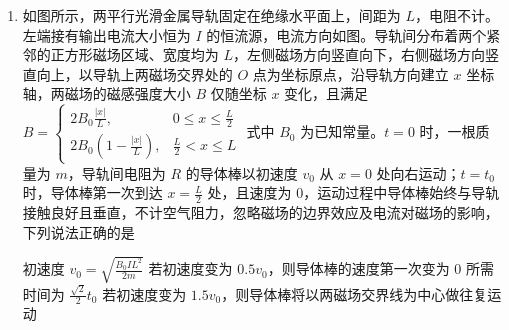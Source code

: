 \documentclass[\gkver]{gaokaozhenti}
\begin{document}
\begin{enumerate}
\item
如图所示，两平行光滑金属导轨固定在绝缘水平面上，间距为 $L$，电阻不计。左端接有输出电流大小恒为 $I$ 的恒流源，电流方向如图。导轨间分布着两个紧邻的正方形磁场区域、宽度均为 $L$，左侧磁场方向竖直向下，右侧磁场方向竖直向上，以导轨上两磁场交界处的 $O$ 点为坐标原点，沿导轨方向建立 $x$ 坐标轴，两磁场的磁感强度大小 $B$ 仅随坐标 $x$ 变化，且满足 $B = \begin{cases} 2B_{0}\frac{|x|}{L}, & 0 \le x \le \frac{L}{2} \\ 2B_{0}\left(1-\frac{|x|}{L}\right), & \frac{L}{2} < x \le L \end{cases}$ 式中 $B_{0}$ 为已知常量。$t = 0$ 时，一根质量为 $m$，导轨间电阻为 $R$ 的导体棒以初速度 $v_{0}$ 从 $x = 0$ 处向右运动；$t = t_{0}$ 时，导体棒第一次到达 $x = \frac{L}{2}$ 处，且速度为 0，运动过程中导体棒始终与导轨接触良好且垂直，不计空气阻力，忽略磁场的边界效应及电流对磁场的影响，下列说法正确的是
\onepicture[w=7.86cm]{}

{初速度 $v_{0} = \sqrt{\frac{B_{0}IL^{2}}{2m}}$}
{若初速度变为 $0.5v_{0}$，则导体棒的速度第一次变为 $0$ 所需时间为 $\frac{\sqrt{2}}{2}t_{0}$}
{若初速度变为 $1.5v_{0}$，则导体棒将以两磁场交界线为中心做往复运动}

\end{enumerate}
\end{document}

